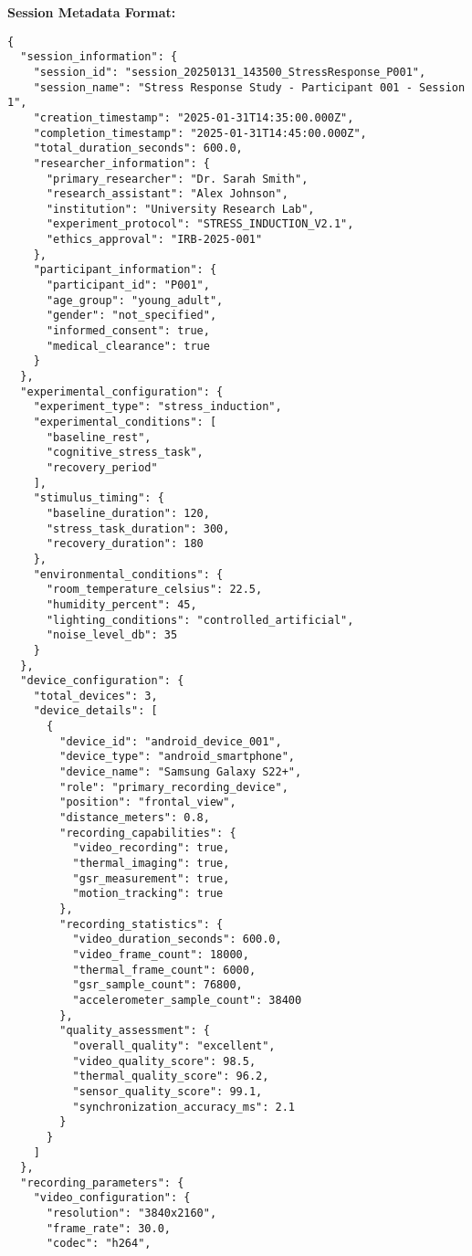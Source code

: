\documentclass[11pt,a4paper]{article}
\begin{document}
\textbf{Session Metadata Format:}

\begin{verbatim}
{
  "session_information": {
    "session_id": "session_20250131_143500_StressResponse_P001",
    "session_name": "Stress Response Study - Participant 001 - Session 1",
    "creation_timestamp": "2025-01-31T14:35:00.000Z",
    "completion_timestamp": "2025-01-31T14:45:00.000Z",
    "total_duration_seconds": 600.0,
    "researcher_information": {
      "primary_researcher": "Dr. Sarah Smith",
      "research_assistant": "Alex Johnson",
      "institution": "University Research Lab",
      "experiment_protocol": "STRESS_INDUCTION_V2.1",
      "ethics_approval": "IRB-2025-001"
    },
    "participant_information": {
      "participant_id": "P001",
      "age_group": "young_adult",
      "gender": "not_specified",
      "informed_consent": true,
      "medical_clearance": true
    }
  },
  "experimental_configuration": {
    "experiment_type": "stress_induction",
    "experimental_conditions": [
      "baseline_rest",
      "cognitive_stress_task",
      "recovery_period"
    ],
    "stimulus_timing": {
      "baseline_duration": 120,
      "stress_task_duration": 300,
      "recovery_duration": 180
    },
    "environmental_conditions": {
      "room_temperature_celsius": 22.5,
      "humidity_percent": 45,
      "lighting_conditions": "controlled_artificial",
      "noise_level_db": 35
    }
  },
  "device_configuration": {
    "total_devices": 3,
    "device_details": [
      {
        "device_id": "android_device_001",
        "device_type": "android_smartphone",
        "device_name": "Samsung Galaxy S22+",
        "role": "primary_recording_device",
        "position": "frontal_view",
        "distance_meters": 0.8,
        "recording_capabilities": {
          "video_recording": true,
          "thermal_imaging": true,
          "gsr_measurement": true,
          "motion_tracking": true
        },
        "recording_statistics": {
          "video_duration_seconds": 600.0,
          "video_frame_count": 18000,
          "thermal_frame_count": 6000,
          "gsr_sample_count": 76800,
          "accelerometer_sample_count": 38400
        },
        "quality_assessment": {
          "overall_quality": "excellent",
          "video_quality_score": 98.5,
          "thermal_quality_score": 96.2,
          "sensor_quality_score": 99.1,
          "synchronization_accuracy_ms": 2.1
        }
      }
    ]
  },
  "recording_parameters": {
    "video_configuration": {
      "resolution": "3840x2160",
      "frame_rate": 30.0,
      "codec": "h264",

\end{verbatim}
\end{document}
